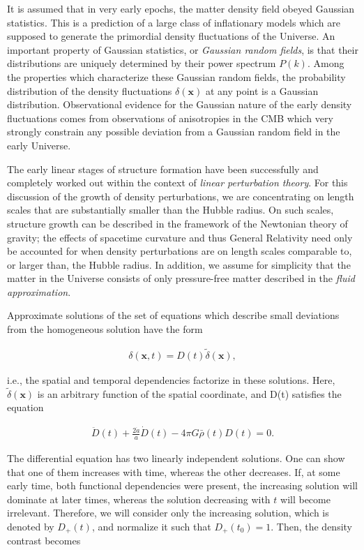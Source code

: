 \documentclass[a4paper,11pt]{article}
\begin{document}
{\noindent}It is assumed that in very early epochs, the matter density field obeyed Gaussian statistics. This is a prediction of a large class of inflationary models which are supposed to generate the primordial density fluctuations of the Universe. An important property of Gaussian statistics, or \textit{Gaussian random fields}, is that their distributions are uniquely determined by their power spectrum $P(k)$. Among the properties which characterize these Gaussian random fields, the probability distribution of the density fluctuations $\delta(\mathbf{x})$ at any point is a Gaussian distribution. Observational evidence for the Gaussian nature of the early density fluctuations comes from observations of anisotropies in the CMB which very strongly constrain any possible deviation from a Gaussian random field in the early Universe.

{\noindent}The early linear stages of structure formation have been successfully and completely worked out within the context of \textit{linear perturbation theory}. For this discussion of the growth of density perturbations, we are concentrating on length scales that are substantially smaller than the Hubble radius. On such scales, structure growth can be described in the framework of the Newtonian theory of gravity; the effects of spacetime curvature and thus General Relativity need only be accounted for when density perturbations are on length scales comparable to, or larger than, the Hubble radius. In addition, we assume for simplicity that the matter in the Universe consists of only pressure-free matter described in the \textit{fluid approximation}.

{\noindent}Approximate solutions of the set of equations which describe small deviations from the homogeneous solution have the form

\begin{align*}
    \delta(\mathbf{x},t)=D(t)\tilde{\delta}(\mathbf{x}),
\end{align*}

{\noindent}i.e., the spatial and temporal dependencies factorize in these solutions. Here, $\tilde{\delta}(\mathbf{x})$ is an arbitrary function of the spatial coordinate, and D(t) satisfies the equation

\begin{align*}
    \ddot{D}(t)+\frac{2\dot{a}}{a}\dot{D}(t)-4\pi G\bar{\rho}(t)D(t) = 0.
\end{align*}

{\noindent}The differential equation has two linearly independent solutions. One can show that one of them increases with time, whereas the other decreases. If, at some early time, both functional dependencies were present, the increasing solution will dominate at later times, whereas the solution decreasing with $t$ will become irrelevant. Therefore, we will consider only the increasing solution, which is denoted by $D_+(t)$, and normalize it such that $D_+(t_0)=1$. Then, the density contrast becomes
\end{document}
